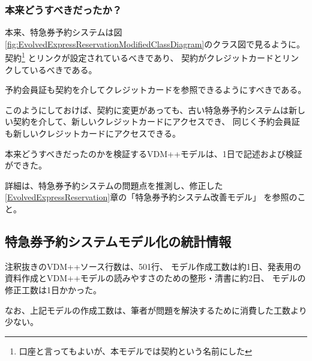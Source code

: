 	\subsubsection {本来どうすべきだったか？}
本来、特急券予約システムは図\ref{fig:EvolvedExpressReservationModifiedClassDiagram}のクラス図で見るように。
契約\footnote{口座と言ってもよいが、本モデルでは契約という名前にした}
とリンクが設定されているべきであり、
契約がクレジットカードとリンクしているべきである。

予約会員証も契約を介してクレジットカードを参照できるようにすべきである。

このようにしておけば、契約に変更があっても、古い特急券予約システムは新しい契約を介して、新しいクレジットカードにアクセスでき、
同じく予約会員証も新しいクレジットカードにアクセスできる。

本来どうすべきだったのかを検証するVDM++モデルは、1日で記述および検証ができた。

詳細は、特急券予約システムの問題点を推測し、修正した\ref{EvolvedExpressReservation}章の「特急券予約システム改善モデル」
を参照のこと。

%
%

\subsection {特急券予約システムモデル化の統計情報}
注釈抜きのVDM++ソース行数は、501行、
モデル作成工数は約1日、発表用の資料作成とVDM++モデルの読みやすさのための整形・清書に約2日、
モデルの修正工数は1日かかった。

なお、上記モデルの作成工数は、筆者が問題を解決するために消費した工数より少ない。